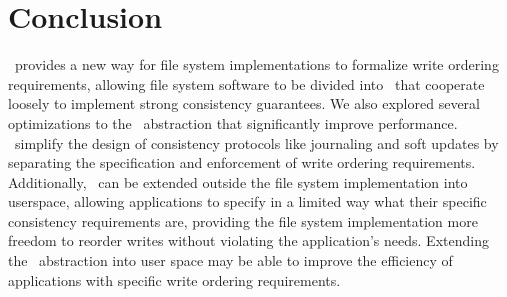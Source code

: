 \section{Conclusion}
\label{sec:conclusion}

\Kudos\ provides a new way for file system implementations to formalize
write ordering requirements, allowing file system software to be divided
into \modules\ that cooperate loosely to implement strong consistency
guarantees. We also explored several optimizations to the \chdesc\
abstraction that significantly improve performance.  \Patches\
simplify the design of consistency protocols like
journaling and soft updates by separating the specification and enforcement
of write ordering requirements. Additionally, \chdescs\ can be extended
outside the file system implementation into userspace, allowing
applications to specify in a limited way what their specific consistency
requirements are, providing the file system implementation more freedom to
reorder writes without violating the application's needs. 
Extending the \patch\ abstraction into user space may be able to improve
the efficiency of applications with specific write ordering requirements.
